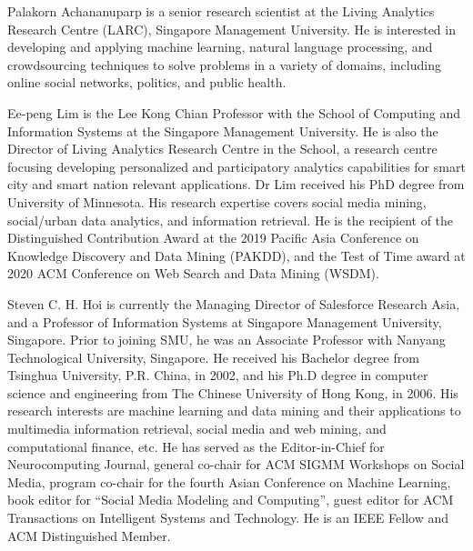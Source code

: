 \documentclass[journal]{IEEEtran}
\begin{document}
\begin{IEEEbiography}{Palakorn Achananuparp}
is a senior research scientist at the Living Analytics Research Centre (LARC), Singapore Management University. He is interested in developing and applying machine learning, natural language processing, and crowdsourcing techniques to solve problems in a variety of domains, including online social networks, politics, and public health.
\end{IEEEbiography}

\begin{IEEEbiography}{Ee-peng Lim}
is the Lee Kong Chian Professor with the School of Computing and Information Systems at the Singapore Management University. He is also the Director of Living Analytics Research Centre in the School, a research centre focusing developing personalized and participatory analytics capabilities for smart city and smart nation relevant applications. Dr Lim received his PhD degree from University of Minnesota. His research expertise covers social media mining, social/urban data analytics, and information retrieval. He is the recipient of the Distinguished Contribution Award at the 2019 Pacific Asia Conference on Knowledge Discovery and Data Mining (PAKDD), and the Test of Time award at 2020 ACM Conference on Web Search and Data Mining (WSDM).
\end{IEEEbiography}

\begin{IEEEbiography}{Steven C. H. Hoi}
is currently the Managing Director of Salesforce Research Asia, and a Professor of Information Systems at Singapore Management University, Singapore. Prior to joining SMU, he was an Associate Professor with Nanyang Technological University, Singapore. He received his Bachelor degree from Tsinghua University, P.R. China, in 2002, and his Ph.D degree in computer science and engineering from The Chinese University of Hong Kong, in 2006. His research interests are machine learning and data mining and their applications to multimedia information retrieval, social media and web mining, and computational finance, etc. He has served as the Editor-in-Chief for Neurocomputing Journal, general co-chair for ACM SIGMM Workshops on Social Media, program co-chair for the fourth Asian Conference on Machine Learning, book editor for “Social Media Modeling and Computing”, guest editor for ACM Transactions on Intelligent Systems and Technology. He is an IEEE Fellow and ACM Distinguished Member.
\end{IEEEbiography}
\end{document}
